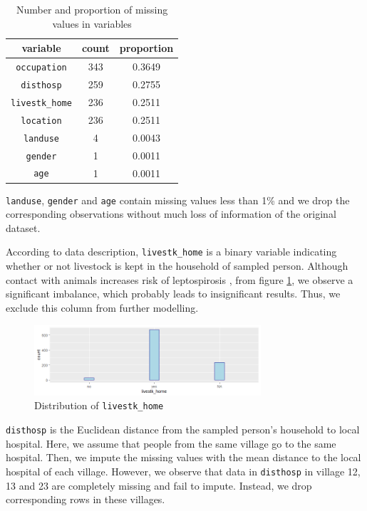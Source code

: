 \documentclass[11pt,twoside]{article}
\numberwithin{Theorem}{section}
\numberwithin{Definition}{section}
\numberwithin{Lemma}{section}
\numberwithin{Algorithm}{section}
\numberwithin{equation}{section}
\begin{document}
\begin{table}[!h]
	\centering
	\begin{tabular}{|c|c|c|}
		\hline
		variable & count & proportion \\
		\hline
		\texttt{occupation} & 343 & 0.3649 \\ 
		\texttt{disthosp} &259 & 0.2755 \\
		\texttt{livestk\_home}  &  236 & 0.2511 \\
        \texttt{location}  &  236 & 0.2511 \\
		\texttt{landuse} & 4 & 0.0043 \\
		\texttt{gender} & 1 & 0.0011 \\
		\texttt{age} & 1 & 0.0011 \\
		\hline
	\end{tabular}
	\caption{Number and proportion of missing values in variables}
	\label{tab:missing}
\end{table}

\texttt{landuse}, \texttt{gender} and \texttt{age} contain missing values less than 1\% and we drop the corresponding observations without much loss of information of the original dataset.

According to data description, \texttt{livestk\_home} is a binary variable indicating whether or not livestock is kept in the household of sampled person. Although contact with animals increases risk of leptospirosis \cite{cook2017risk}, from figure \ref{fig:livestk}, we observe a significant imbalance, which probably leads to insignificant results. Thus, we exclude this column from further modelling.

\begin{figure}[!h]
	\centering
	\includegraphics[width = 0.75\textwidth]{Images/livestk.png}
	\caption{Distribution of \texttt{livestk\_home}}
	\label{fig:livestk}
\end{figure}

\texttt{disthosp} is the Euclidean distance from the sampled person's household to local hospital. Here, we assume that people from the same village go to the same hospital. Then, we impute the missing values with the mean distance to the local hospital of each village. However, we observe that data in \texttt{disthosp} in village 12, 13 and 23 are completely missing and fail to impute. Instead, we drop corresponding rows in these villages. 
\end{document}
